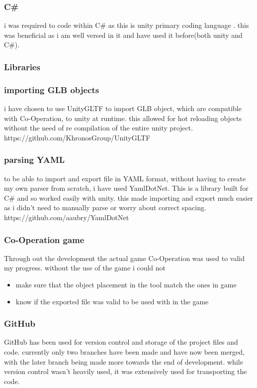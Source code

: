 \subsubsection{C\#}
i was required to code within C\# as this is unity primary coding language . this was beneficial as i am well versed in it and have used it before(both unity and C\#).

\subsubsection{Libraries}
\subsubsection*{importing GLB objects}
i have chosen to use UnityGLTF to import GLB object, which are compatible with Co-Operation, to unity at runtime. this allowed for hot reloading objects without the need of re compilation of the entire unity project.\\
https://github.com/KhronosGroup/UnityGLTF
\subsubsection*{parsing YAML}
to be able to import and export file in YAML format, without having to create my own parser from scratch, i have used YamlDotNet. This is a library built for C\# and so worked easily with unity. this made importing and export much easier as i didn't need to manually parse or worry about correct spacing.\\
https://github.com/aaubry/YamlDotNet 
\subsubsection{Co-Operation game}
Through out the development the actual game Co-Operation was used to valid my progress. without the use of the game i could not 
\begin{itemize}
	\item make sure that the object placement in the tool match the ones in game
	\item know if the exported file was valid to be used with in the game
\end{itemize}
\subsubsection{GitHub}
GitHub has been used for version control and storage of the project files and code. currently only two branches have been made and have now been merged, with the later branch being made more towards the end of development. while version control wasn't heavily used, it was extensively used for transporting the code.

